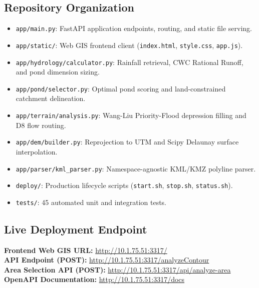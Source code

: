 \documentclass[manuscript,screen,review]{acmart}
\begin{document}
\subsection{Repository Organization}
\begin{itemize}
    \item \texttt{app/main.py}: FastAPI application endpoints, routing, and static file serving.
    \item \texttt{app/static/}: Web GIS frontend client (\texttt{index.html}, \texttt{style.css}, \texttt{app.js}).
    \item \texttt{app/hydrology/calculator.py}: Rainfall retrieval, CWC Rational Runoff, and pond dimension sizing.
    \item \texttt{app/pond/selector.py}: Optimal pond scoring and land-constrained catchment delineation.
    \item \texttt{app/terrain/analysis.py}: Wang-Liu Priority-Flood depression filling and D8 flow routing.
    \item \texttt{app/dem/builder.py}: Reprojection to UTM and Scipy Delaunay surface interpolation.
    \item \texttt{app/parser/kml\_parser.py}: Namespace-agnostic KML/KMZ polyline parser.
    \item \texttt{deploy/}: Production lifecycle scripts (\texttt{start.sh}, \texttt{stop.sh}, \texttt{status.sh}).
    \item \texttt{tests/}: 45 automated unit and integration tests.
\end{itemize}

\subsection{Live Deployment Endpoint}
\begin{center}
\textbf{Frontend Web GIS URL:} \url{http://10.1.75.51:3317/} \\
\textbf{API Endpoint (POST):} \url{http://10.1.75.51:3317/analyzeContour} \\
\textbf{Area Selection API (POST):} \url{http://10.1.75.51:3317/api/analyze-area} \\
\textbf{OpenAPI Documentation:} \url{http://10.1.75.51:3317/docs}
\end{center}
\end{document}
